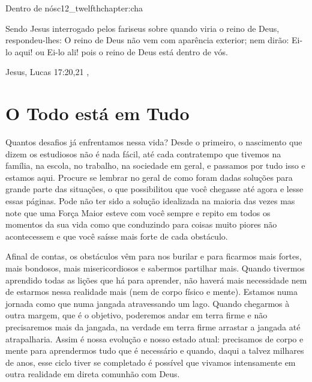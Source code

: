 \begin{chapterpage}{Dentro de nós}{c12_twelfthchapter:cha}

\begin{myquotation} Sendo Jesus interrogado pelos fariseus sobre quando viria o reino de Deus, respondeu-lhes: O reino de Deus não vem com aparência exterior; nem dirão: Ei-lo aqui! ou Ei-lo ali! pois o reino de Deus está dentro de vós.  

\par\vspace*{15mm}
\mbox{}\hfill \emdash{}Jesus, Lucas 17:20,21 
, %
\par\end{myquotation}

\end{chapterpage}



\section{O Todo está em Tudo}\label{c1_basicformatting:sec}

\emdash{}Quantos desafios já enfrentamos nessa vida? Desde o primeiro, o nascimento que dizem os estudiosos não é nada fácil, até cada contratempo que tivemos na família, na escola, no trabalho, na sociedade em geral, e passamos por tudo isso e estamos aqui. Procure se lembrar no geral de como foram dadas soluções para grande parte das situações, o que possibilitou que você chegasse até agora e lesse essas páginas. Pode não ter sido a solução idealizada na maioria das vezes mas note que uma Força Maior esteve com você sempre e repito em todos os momentos da sua vida como que conduzindo para coisas muito piores não acontecessem e que você saísse mais forte de cada obstáculo.

\emdash{}Afinal de contas, os obstáculos vêm para nos burilar e para ficarmos mais fortes, mais bondosos, mais misericordiosos e sabermos partilhar mais. Quando tivermos aprendido todas as lições que há para aprender, não haverá mais necessidade nem de estarmos nessa realidade mais (nem de corpo físico e mente). Estamos numa jornada como que numa jangada atravessando um lago. Quando chegarmos à outra margem, que é o objetivo, poderemos andar em terra firme e não precisaremos mais da jangada, na verdade em terra firme arrastar a jangada até atrapalharia. Assim é nossa evolução e nosso estado atual: precisamos de corpo e mente para aprendermos tudo que é necessário e quando, daqui a talvez milhares de anos, esse ciclo tiver se completado é possível que vivamos intensamente em outra realidade em direta comunhão com Deus.

